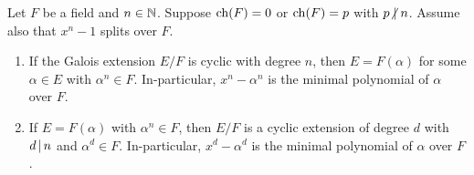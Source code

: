 \documentclass[11pt]{article}
\begin{document}
\begin{theorem}
    Let $F$ be a field and $n\in\mathbb{N}$. Suppose $\operatorname{ch}(F)=0$ or $\operatorname{ch}(F)=p$ with $p\nd n$. Assume also that $x^n-1$ splits over $F$.
    \begin{enumerate}
        \item If the Galois extension $E/F$ is cyclic with degree $n$, then $E=F(\alpha)$ for some $\alpha\in E$ with $\alpha^n\in F$. In-particular, $x^n-\alpha^n$ is the minimal polynomial of $\alpha$ over $F$.

        \item If $E=F(\alpha)$ with $\alpha^n\in F$, then $E/F$ is a cyclic extension of degree $d$ with $d\,|\, n$ and $\alpha^d\in F$. In-particular, $x^d-\alpha^d$ is the minimal polynomial of $\alpha$ over $F$.
    \end{enumerate}
\end{theorem}
\end{document}
